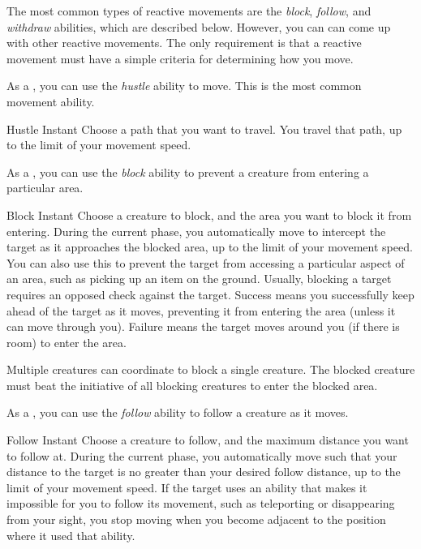         The most common types of reactive movements are the \textit{block}, \textit{follow}, and \textit{withdraw} abilities, which are described below.
        However, you can can come up with other reactive movements.
        The only requirement is that a reactive movement must have a simple criteria for determining how you move.

         As a , you can use the \textit{hustle} ability to move.
        This is the most common movement ability.

        \begin{instantability}{Hustle}
            \label{Hustle}
            Instant
            \rankline
            Choose a path that you want to travel. You travel that path, up to the limit of your movement speed.
        \end{instantability}

         As a , you can use the \textit{block} ability to prevent a creature from entering a particular area.

        \begin{instantability}{Block}
            \label{Block}
            Instant
            \rankline
            Choose a creature to block, and the area you want to block it from entering.
            During the current phase, you automatically move to intercept the target as it approaches the blocked area, up to the limit of your movement speed.
            You can also use this to prevent the target from accessing a particular aspect of an area, such as picking up an item on the ground.
            Usually, blocking a target requires an opposed  check against the target.
            Success means you successfully keep ahead of the target as it moves, preventing it from entering the area (unless it can move through you).
            Failure means the target moves around you (if there is room) to enter the area.

            Multiple creatures can coordinate to block a single creature.
            The blocked creature must beat the initiative of all blocking creatures to enter the blocked area.
        \end{instantability}

         As a , you can use the \textit{follow} ability to follow a creature as it moves.

        \begin{instantability}{Follow}
            \label{Follow}
            Instant
            \rankline
            Choose a creature to follow, and the maximum distance you want to follow at.
            During the current phase, you automatically move such that your distance to the target is no greater than your desired follow distance, up to the limit of your movement speed.
            If the target uses an ability that makes it impossible for you to follow its movement, such as teleporting or disappearing from your sight, you stop moving when you become adjacent to the position where it used that ability.
        \end{instantability}

